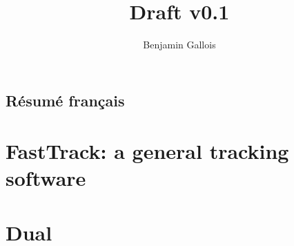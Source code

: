 \documentclass[12pt,a4paper]{report}
\title{Draft v0.1}
\author{Benjamin Gallois}
\begin{document}

\chapter*{Résumé français}




\tableofcontents

\part{FastTrack: a general tracking software}


\part{Dual}




\end{document}
